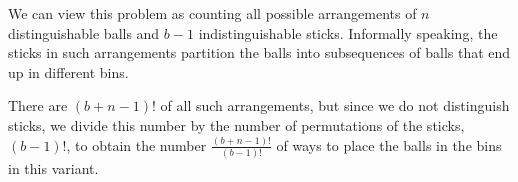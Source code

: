 We can view this problem as counting all possible arrangements of $n$ distinguishable balls and $b-1$ indistinguishable sticks.
Informally speaking, the sticks in such arrangements partition the balls into subsequences of balls that end up in different bins.

There are $(b+n-1)!$ of all such arrangements, but since we do not distinguish sticks, we divide this number by the number of permutations of the sticks, $(b-1)!$, to obtain the number $\frac{(b+n-1)!}{(b-1)!}$ of ways to place the balls in the bins in this variant.
